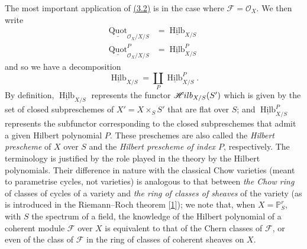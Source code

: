\documentclass{article}
\newcommand{\oldpage}[1]{\marginpar{\footnotesize$\Big\vert$ \textit{p.~#1}}}
\theoremstyle{definition}
\theoremstyle{definition}
\theoremstyle{definition}
\theoremstyle{definition}
\theoremstyle{remark}
\begin{document}
The most important application of \protect\hyperlink{fga-3-iv-theorem-3.2}{(3.2)} is in the case where \({\mathscr{F}}={\mathscr{O}}_X\).
We then write
\[
  \begin{aligned}
    \underline{\operatorname{Quot}}_{{\mathscr{O}}_X/X/S}
    &= \underline{\operatorname{Hilb}}_{X/S}
  \\\underline{\operatorname{Quot}}_{{\mathscr{O}}_X/X/S}^P
    &= \underline{\operatorname{Hilb}}_{X/S}^P
  \end{aligned}
\]
and so we have a decomposition
\[
  \underline{\operatorname{Hilb}}_{X/S} = \coprod_P \underline{\operatorname{Hilb}}_{X/S}^P.
\]
By definition, \(\underline{\operatorname{Hilb}}_{X/S}\) represents the functor \(\mathscr{H}\kern -.5pt ilb_{X/S}(S')\) which is given by the set of closed subpreschemes of \(X'=X\times_S S'\) that are flat over \(S\);
and \(\underline{\operatorname{Hilb}}_{X/S}^P\) represents the subfunctor corresponding to the closed subpreschemes that admit a given Hilbert polynomial \(P\).
These preschemes are also called the \emph{Hilbert prescheme} of \(X\) over \(S\) and the \emph{Hilbert prescheme of index \(P\)}, respectively.
The terminology is justified by the role played in the theory by the Hilbert polynomials.
Their difference in nature with the classical Chow varieties (meant to parametrise cycles, not varieties) is analogous to that between \emph{the Chow ring} of classes of cycles of a variety and \emph{the ring of classes of sheaves} of the variety (as is introduced in the Riemann--Roch theorem {[}\protect\hyperlink{ref-BS1958}{1}{]});
\oldpage{221-18}we note that, when \(X=\mathbb{P}_S^r\), with \(S\) the spectrum of a field, the knowledge of the Hilbert polynomial of a coherent module \({\mathscr{F}}\) over \(X\) is equivalent to that of the Chern classes of \({\mathscr{F}}\), or even of the class of \({\mathscr{F}}\) in the ring of classes of coherent sheaves on \(X\).
\end{document}
